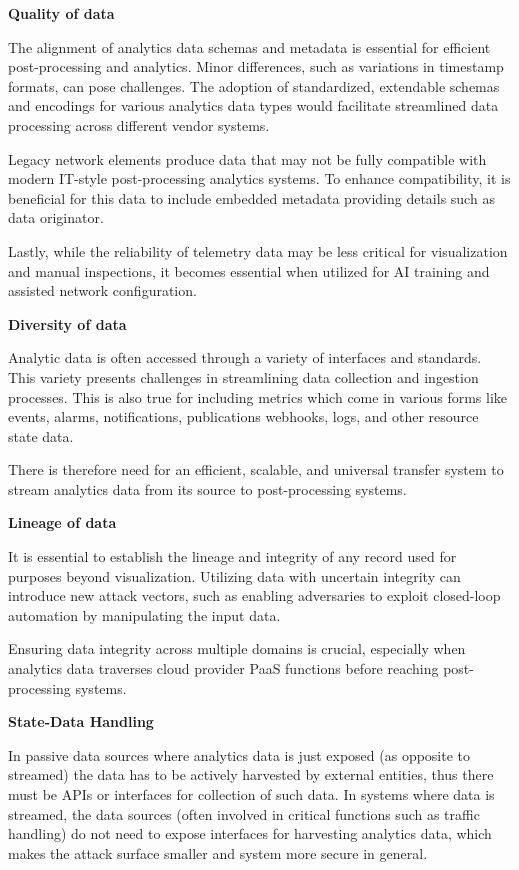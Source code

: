 \documentclass[10pt,sigconf]{iabart}
\begin{document}

\textbf{Quality of data} 

The alignment of analytics data schemas and metadata is essential for efficient post-processing and analytics. Minor differences, such as variations in timestamp formats, can pose challenges. The adoption of standardized, extendable schemas and encodings for various analytics data types would facilitate streamlined data processing across different vendor systems.

Legacy network elements produce data that may not be fully compatible with modern IT-style post-processing analytics systems. To enhance compatibility, it is beneficial for this data to include embedded metadata providing details such as data originator.

Lastly, while the reliability of telemetry data may be less critical for visualization and manual inspections, it becomes essential when utilized for AI training and assisted network configuration.

\textbf{Diversity of data} 

Analytic data is often accessed through a variety of interfaces and standards. This variety presents challenges in streamlining data collection and ingestion processes. This is also true for including metrics which come in various forms like events, alarms, notifications, publications webhooks, logs, and other resource state data.

There is therefore need for an efficient, scalable, and universal transfer system to stream analytics data from its source to post-processing systems.

\textbf{Lineage of data}

It is essential to establish the lineage and integrity of any record used for purposes beyond visualization. Utilizing data with uncertain integrity can introduce new attack vectors, such as enabling adversaries to exploit closed-loop automation by manipulating the input data. 

Ensuring data integrity across multiple domains is crucial, especially when analytics data traverses cloud provider PaaS functions before reaching post-processing systems.

\textbf{State-Data Handling}

In passive data sources where analytics data is just exposed (as opposite to streamed) the data has to be actively harvested by external entities, thus there must be APIs or interfaces for collection of such data. In systems where data is streamed, the data sources (often involved in critical functions such as traffic handling) do not need to expose interfaces for harvesting analytics data, which makes the attack surface smaller and system more secure in general.
\end{document}
